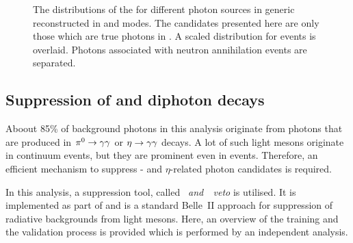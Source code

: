 \begin{figure}[htbp!]
    \centering
    \caption{\label{fig:zmva_distribution_sources} The distributions of the \ZMVA for different photon sources in generic \MC reconstructed in \feiBp and \feiBz modes.
    The candidates presented here are only those which are true photons in .
    A scaled \ZMVA distribution for \BtoXsgamma events is overlaid.
    Photons associated with neutron annihilation events are separated.}
\end{figure}

\subsection{Suppression of \texorpdfstring{\piz}{pi0} and \texorpdfstring{\eta}{eta} diphoton decays}\label{sec:selection_vetos}

Aboout 85\% of background photons in this analysis originate from photons that are produced in $\pi^0\rightarrow\gamma\gamma$ or $\eta\rightarrow\gamma\gamma$ decays.
A lot of such light mesons originate in continuum events, but they are prominent even in \BB events.
Therefore, an efficient mechanism to suppress \piz- and $\eta$-related photon candidates is required.

In this analysis, a suppression tool, called \textit{\piz~and~\eta~veto} is utilised.
It is implemented as part of \basftwo and is a standard Belle~II approach for suppression of radiative backgrounds from light mesons.
Here, an overview of the training and the validation process is provided which is performed by an independent analysis.

